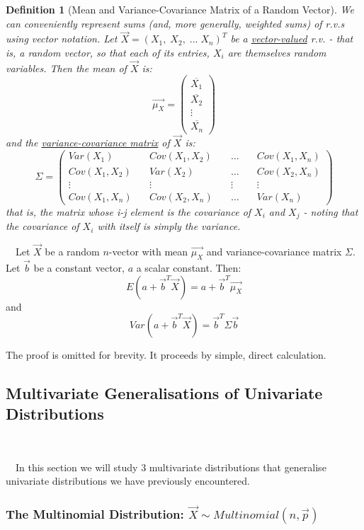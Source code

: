 \documentclass[12pt,a4paper]{article}
\newtheorem{defn}[thm]{Definition}
\begin{document}
\begin{defn}[Mean and Variance-Covariance Matrix of a Random Vector]\vspace{1cm}

We can conveniently represent sums (and, more generally, weighted sums) of r.v.s using vector notation.
Let $\vec{X} = (X_1,\; X_2,\; ...\; X_n)^T$ be a \underline{vector-valued} r.v. - that is, a random vector, so that each of its entries, $X_i$ are themselves random variables. Then the mean of $\vec{X}$ is:
$$\vec{\mu_X} = \left(\begin{array}{c}\overline{X_1}\\ \overline{X_2}\\ \vdots\\ \overline{X_n} \end{array}\right)$$
and the \underline{variance-covariance matrix} of $\vec{X}$ is:
$$\Sigma = \left( \begin{array}{cccc} Var(X_1)\quad& Cov(X_1,X_2)\quad& \hdots\quad& Cov(X_1,X_n)\\Cov(X_1,X_2)\quad& Var(X_2)\quad& \hdots\quad& Cov(X_2,X_n)\\ \vdots\quad& \vdots & \vdots\quad & \vdots\\ Cov(X_1,X_n) & Cov(X_2,X_n)\quad& \hdots& Var(X_n) \end{array}\right)$$
that is, the matrix whose i-j element is the covariance of $X_i$ and $X_j$ - noting that the covariance of $X_i$ with itself is simply the variance.

\end{defn}


$\quad$Let $\vec{X}$ be a random $n$-vector with mean $\vec{\mu_X}$ and variance-covariance matrix $\Sigma$. Let $\vec{b}$ be a constant vector, $a$ a scalar constant. Then:
$$E(a+\vec{b}^T\vec{X}) = a + \vec{b}^T\vec{\mu_X}$$
and
$$Var(a + \vec{b}^T\vec{X}) = \vec{b}^T\Sigma\vec{b}$$

The proof is omitted for brevity. It proceeds by simple, direct calculation.


\subsection{Multivariate Generalisations of Univariate Distributions}$\;$

$\quad$In this section we will study 3 multivariate distributions that generalise univariate distributions we have previously encountered.

\subsubsection{The Multinomial Distribution: $\vec{X}\sim Multinomial(n, \vec{p})$}
\end{document}
